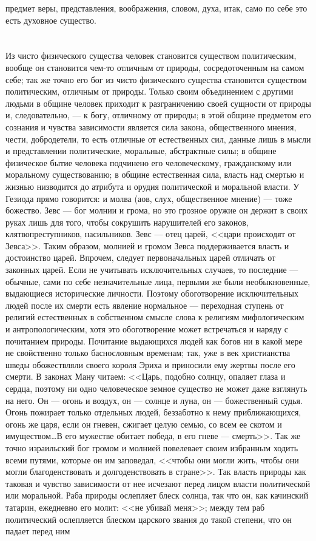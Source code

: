 \documentclass[12pt,oneside]{book}
\begin{document}
предмет веры, представления, воображения, словом, духа, итак, само по себе это есть духовное существо.


\chapter{}

Из чисто физического существа человек становится существом политическим, вообще он становится чем-то отличным от природы, сосредоточенным на самом себе; так же точно его бог из чисто физического существа становится существом политическим, отличным от природы. Только своим объединением с другими людьми в общине человек приходит к разграничению своей сущности от природы и, следовательно, --- к богу, отличному от природы; в этой общине предметом его сознания и чувства зависимости является сила закона, общественного мнения, чести, добродетели, то есть отличные от естественных сил, данные лишь в мысли и представлении политические, моральные, абстрактные силы; в общине физическое бытие человека подчинено его человеческому, гражданскому или моральному существованию; в общине естественная сила, власть над смертью и жизнью низводится до атрибута и орудия политической и моральной власти. У Гезиода прямо говорится: и молва (аов, слух, общественное мнение) --- тоже божество. Зевс --- бог молнии и грома, но это грозное оружие он держит в своих руках лишь для того, чтобы сокрушить нарушителей его законов, клятвопреступников, насильников. Зевс --- отец царей, <<цари происходят от Зевса>>. Таким образом, молнией и громом Зевса поддерживается власть и достоинство царей. Впрочем, следует первоначальных царей отличать от законных царей. Если не учитывать исключительных случаев, то последние --- обычные, сами по себе незначительные лица, первыми же были необыкновенные, выдающиеся исторические личности. Поэтому обоготворение исключительных людей после их смерти есть явление нормальное --- переходная ступень от религий естественных в собственном смысле слова к религиям мифологическим и антропологическим, хотя это обоготворение может встречаться и наряду с почитанием природы. Почитание выдающихся людей как богов ни в какой мере не свойственно только баснословным временам; так, уже в век христианства шведы обожествляли своего короля Эриха и приносили ему жертвы после его смерти. В законах Ману читаем: <<Царь, подобно солнцу, опаляет глаза и сердца, поэтому ни одно человеческое земное существо не может даже взглянуть на него. Он --- огонь и воздух, он --- солнце и луна, он --- божественный судья. Огонь пожирает только отдельных людей, беззаботно к нему приближающихся, огонь же царя, если он гневен, сжигает целую семью, со всем ее скотом и имуществом\dots В его мужестве обитает победа, в его гневе --- смерть>>. Так же точно израильский бог громом и молнией повелевает своим избранным ходить всеми путями, которые он им заповедал, <<чтобы они могли жить, чтобы они могли благоденствовать и долгоденствовать в стране>>. Так власть природы как таковая и чувство зависимости от нее исчезают перед лицом власти политической или моральной. Раба природы ослепляет блеск солнца, так что он, как качинский татарин, ежедневно его молит: <<не убивай меня>>; между тем раб политический ослепляется блеском царского звания до такой степени, что он падает перед ним 
\end{document}
